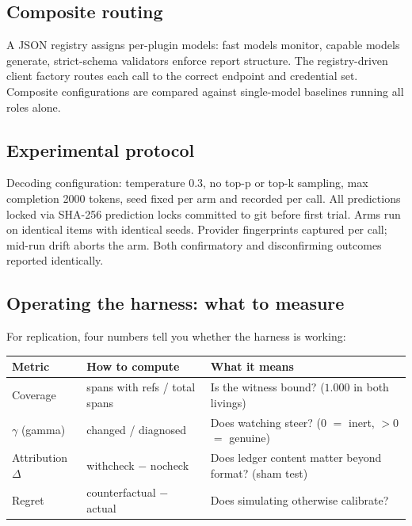 \documentclass[11pt]{article}
\begin{document}
\subsection{Composite routing}

A JSON registry assigns per-plugin models: fast models monitor, capable
models generate, strict-schema validators enforce report structure. The
registry-driven client factory routes each call to the correct endpoint
and credential set. Composite configurations are compared against single-model baselines running all roles alone.

\subsection{Experimental protocol}

Decoding configuration: temperature 0.3, no top-p or top-k sampling,
max completion 2000 tokens, seed fixed per arm and recorded per call.
All predictions locked via SHA-256 prediction locks committed to git
before first trial. Arms run on identical items with identical seeds.
Provider fingerprints captured per call; mid-run drift aborts the arm.
Both confirmatory and disconfirming outcomes reported identically.

\subsection{Operating the harness: what to measure}

For replication, four numbers tell you whether the harness is working:

\begin{center}
\small
\begin{tabular}{P{3.4cm}P{3.8cm}P{5.4cm}}
\toprule
Metric & How to compute & What it means \\
\midrule
Coverage & spans with refs / total spans & Is the witness bound? ($1.000$ in both livings) \\
$\gamma$ (gamma) & changed / diagnosed & Does watching steer? ($0$ $=$ inert, $>0$ $=$ genuine) \\
Attribution $\Delta$ & withcheck $-$ nocheck & Does ledger content matter beyond format? (sham test) \\
Regret & counterfactual $-$ actual & Does simulating otherwise calibrate? \\
\bottomrule
\end{tabular}
\end{center}
\end{document}
